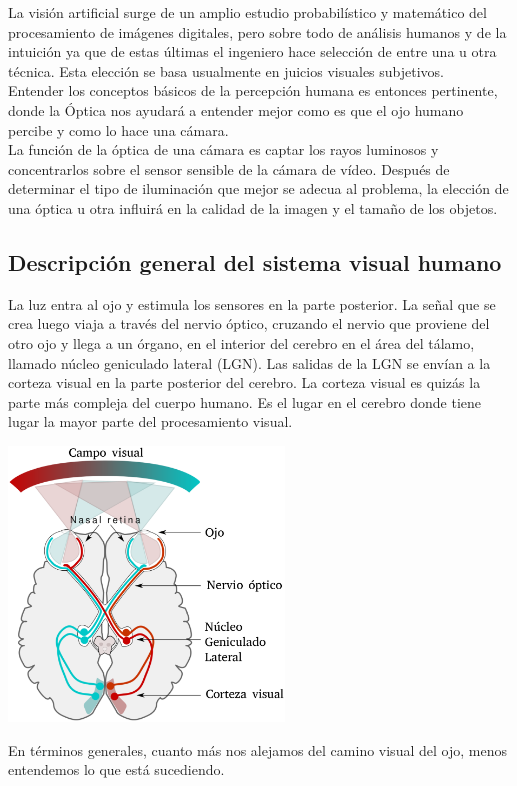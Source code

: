 La visión artificial surge de un amplio estudio probabilístico y matemático del
procesamiento de imágenes digitales, pero sobre todo de análisis humanos y de la
intuición ya que de estas últimas el ingeniero hace selección de entre una u otra
técnica. Esta elección se basa usualmente en juicios visuales subjetivos.\\
Entender los conceptos básicos de la percepción humana es entonces pertinente, donde
la Óptica nos ayudará a entender mejor como es que el ojo humano percibe y como lo
hace una cámara. \\
La función de la óptica de una cámara es captar los rayos luminosos y concentrarlos
sobre el sensor sensible de la cámara de vídeo. Después de determinar el tipo de
iluminación que mejor se adecua al problema, la elección de una óptica u otra influirá
en la calidad de la imagen y el tamaño de los objetos.

\subsection{Descripción general del sistema visual humano}
La luz entra al ojo y estimula los sensores en la parte posterior.
La señal que se crea luego viaja a través del nervio óptico, cruzando el
nervio que proviene del otro ojo y llega a un órgano, en el interior del
cerebro en el área del tálamo, llamado núcleo geniculado lateral (LGN).
Las salidas de la LGN se envían a la corteza visual en la parte posterior del cerebro.
La corteza visual es quizás la parte más compleja del cuerpo humano. Es el lugar en el
cerebro donde tiene lugar la mayor parte del procesamiento visual.~\cite{anilbharath2008}
\begin{center}
    \includegraphics[width=0.55\textwidth]{Capitulo2/Fig1_1.eps}
    \label{Fig1_1}
\end{center}
En términos generales, cuanto más nos alejamos del camino visual del ojo, menos
entendemos lo que está sucediendo.

